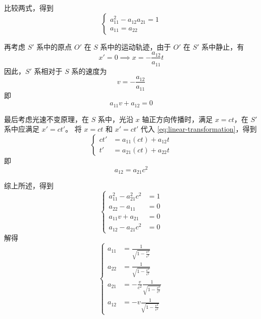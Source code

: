 比较两式，得到
\begin{equation}
    \left\{
    \begin{aligned}
        a_{11}^2 - a_{12} a_{21} = 1 \\
        a_{11} = a_{22}
    \end{aligned}
    \right.
\end{equation}

再考虑 $S'$ 系中的原点 $O'$ 在 $S$ 系中的运动轨迹，由于 $O'$ 在 $S'$ 系中静止，有
\begin{equation}
    x' = 0 \implies x = -\frac{a_{12}}{a_{11}} t
\end{equation}
因此，$S'$ 系相对于 $S$ 系的速度为
\begin{equation}
    v = -\frac{a_{12}}{a_{11}}
\end{equation}
即
\begin{equation}
    a_{11} v + a_{12} = 0
\end{equation}

最后考虑光速不变原理，在 $S$ 系中，光沿 $x$ 轴正方向传播时，满足 $x = c t$，在 $S'$ 系中应满足 $x' = c t'$。
将 $x = c t$ 和 $x' = c t'$ 代入 \cref{eq:linear-transformation}，得到
\begin{equation}
    \left\{
    \begin{aligned}
        c t' & = a_{11} (c t) + a_{12} t \\
        t'   & = a_{21} (c t) + a_{22} t
    \end{aligned}
    \right.
\end{equation}
即
\begin{equation}
    a_{12} = a_{21} c^2
\end{equation}

综上所述，得到
\begin{equation}
    \left\{
    \begin{aligned}
        a_{11}^2 - a_{21}^2 c^2 & = 1 \\
        a_{22} - a_{11}         & = 0 \\
        a_{11} v + a_{21}       & = 0 \\
        a_{12} - a_{21} c^2     & = 0
    \end{aligned}
    \right.
\end{equation}
解得
\begin{equation}
    \left\{
    \begin{aligned}
        a_{11} & = \frac{1}{\sqrt{1 - \frac{v^2}{c^2}}}                \\
        a_{22} & = \frac{1}{\sqrt{1 - \frac{v^2}{c^2}}}                \\
        a_{21} & = -\frac{v}{c^2} \frac{1}{\sqrt{1 - \frac{v^2}{c^2}}} \\
        a_{12} & = -v \frac{1}{\sqrt{1 - \frac{v^2}{c^2}}}
    \end{aligned}
    \right.
\end{equation}

